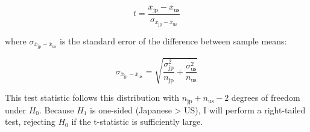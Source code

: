 $$
t = \frac{\bar{x}_{\text{jp}} - \bar{x}_{\text{us}}}{\sigma_{\bar{x}_{\text{jp}} - \bar{x}_{\text{us}}}}
$$

where $\sigma_{\bar{x}_\text{jp} - \bar{x}_\text{us}}$ is the standard error of the difference between sample means:

$$
\sigma_{\bar{x}_{\text{jp}} - \bar{x}_{\text{us}}} = \sqrt{\frac{\sigma_{\text{jp}}^2}{n_{\text{jp}}} + \frac{\sigma_{\text{us}}^2}{n_{\text{us}}}}
$$

This test statistic follows this distribution with $ n_{\text{jp}} + n_{\text{us}} - 2 $ degrees of freedom under $ H_0 $. Because $ H_1 $ is one-sided (Japanese > US), I will perform a right-tailed test, rejecting $ H_0 $ if the t-statistic is sufficiently large.

\newpage
